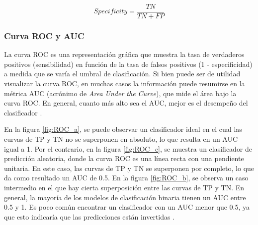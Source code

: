 \begin{equation}
	\label{eq:specificity}
	Specificity = \frac{TN}{TN + FP}
\end{equation}


\subsubsection{Curva ROC y AUC}
La curva ROC es una representación gráfica que muestra la tasa de verdaderos positivos (sensibilidad)
en función de la tasa de falsos positivos (1 - especificidad) a medida que se varía el umbral de 
clasificación. Si bien puede ser de utilidad visualizar la curva ROC, en muchas casos la información 
puede resumirse en la métrica AUC (acrónimo de \emph{Area Under the Curve}), que mide el área bajo la curva 
ROC. En general, cuanto más alto sea el AUC, mejor es el desempeño del clasificador \citep{CITE:37} \citep{CITE:44}. 

En la figura \ref{fig:ROC_a}, se puede observar un clasificador ideal en el cual las curvas de TP y TN no se 
superponen en absoluto, lo que resulta en un AUC igual a 1. Por el contrario, en la figura \ref{fig:ROC_c}, 
se muestra un clasificador de predicción aleatoria, donde la curva ROC es una línea recta con una pendiente unitaria. 
En este caso, las curvas de TP y TN se superponen por completo, lo que da como resultado un AUC de 0.5. 
En la figura \ref{fig:ROC_b}, se observa un caso intermedio en el que hay cierta superposición entre las curvas 
de TP y TN. En general, la mayoría de los modelos de clasificación binaria tienen un AUC entre 0.5 y 1. Es poco 
común encontrar un clasificador con un AUC menor que 0.5, ya que esto indicaría que las predicciones están invertidas \citep{CITE:44}.

